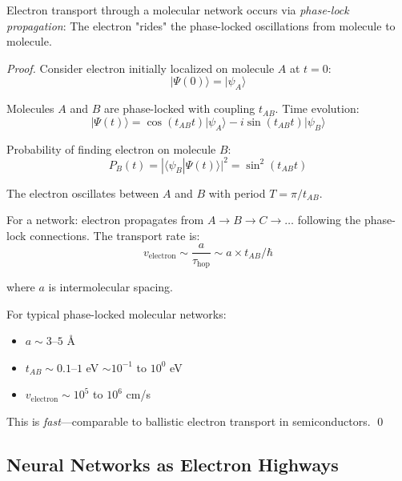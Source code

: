 \begin{theorem}
\label{thm:electron_transport}
Electron transport through a molecular network occurs via \textit{phase-lock propagation}: The electron "rides" the phase-locked oscillations from molecule to molecule.
\end{theorem}

\begin{proof}
Consider electron initially localized on molecule $A$ at $t=0$:
\begin{equation}
|\Psi(0)\rangle = |\psi_A\rangle
\end{equation}

Molecules $A$ and $B$ are phase-locked with coupling $t_{AB}$. Time evolution:
\begin{equation}
|\Psi(t)\rangle = \cos(t_{AB} t) |\psi_A\rangle - i \sin(t_{AB} t) |\psi_B\rangle
\end{equation}

Probability of finding electron on molecule $B$:
\begin{equation}
P_B(t) = |\langle \psi_B | \Psi(t) \rangle|^2 = \sin^2(t_{AB} t)
\end{equation}

The electron oscillates between $A$ and $B$ with period $T = \pi/t_{AB}$.

For a network: electron propagates from $A \to B \to C \to \ldots$ following the phase-lock connections. The transport rate is:
\begin{equation}
v_{\text{electron}} \sim \frac{a}{\tau_{\text{hop}}} \sim a \times t_{AB} / \hbar
\end{equation}

where $a$ is intermolecular spacing.

For typical phase-locked molecular networks:
\begin{itemize}
\item $a \sim 3$--$5$ Å
\item $t_{AB} \sim 0.1$--$1$ eV $\sim 10^{-1}$ to $10^{0}$ eV
\item $v_{\text{electron}} \sim 10^5$ to $10^6$ cm/s
\end{itemize}

This is \textit{fast}—comparable to ballistic electron transport in semiconductors. \qed
\end{proof}

\subsection{Neural Networks as Electron Highways}

